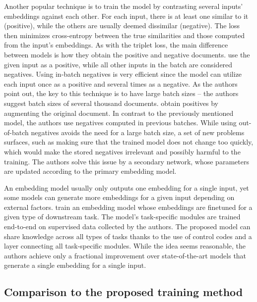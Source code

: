 Another popular technique is to train the model by contrasting several inputs' embeddings against each other. For each input, there is at least one similar to
it (positive), while the others are usually deemed dissimilar (negative).
The loss then minimizes cross-entropy between the true similarities and
those computed from the input's embeddings. As with the triplet loss, the main
difference between models is how they obtain the positive and negative
documents. \cite{neelakantan2022text} use the given input as a positive, while
all other inputs in the batch are considered negatives. Using in-batch
negatives is very efficient since the model can utilize each input once as a
positive and several times as a negative. As the authors point out, the key to
this technique is to have large batch sizes -- the authors suggest batch sizes
of several thousand documents. \cite{izacard2021unsupervised} obtain positives
by augmenting the original document. In contrast to the previously mentioned
model, the authors use negatives computed in previous batches. While using
out-of-batch negatives avoids the need for a large batch size, a set of new
problems surfaces, such as making sure that the trained model does not change
too quickly, which would make the stored negatives irrelevant and possibly
harmful to the training. The authors solve this issue by a secondary network,
whose parameters are updated according to the primary embedding model.

An embedding model usually only outputs one embedding for a single input, yet
some models can generate more embeddings for a given input depending on
external factors. \cite{singh2022scirepeval} train an embedding model whose
embeddings are finetuned for a given type of downstream task. The model's
task-specific modules are trained end-to-end on supervised data collected by
the authors. The proposed model can share knowledge across all types of tasks
thanks to the use of control codes and a layer connecting all task-specific
modules. While the idea seems reasonable, the authors achieve only a fractional
improvement over state-of-the-art models that generate a single embedding for a
single input.

\subsection{Comparison to the proposed training method}

